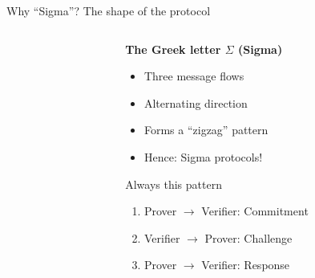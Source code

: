 \documentclass[aspectratio=169, lualatex, handout]{beamer}
\begin{document}
\begin{frame}{Why ``Sigma''? The shape of the protocol}
	\begin{columns}[c]
		\begin{column}{0.5\textwidth}
			\begin{center}
				\huge
			\end{center}
		\end{column}
		\begin{column}{0.5\textwidth}
			\textbf{The Greek letter $\Sigma$ (Sigma)}
			\begin{itemize}
				\item Three message flows
				\item Alternating direction
				\item Forms a ``zigzag'' pattern
				\item Hence: Sigma protocols!
			\end{itemize}
			\begin{alertblock}{Always this pattern}
				\begin{enumerate}
					\item Prover $\rightarrow$ Verifier: Commitment
					\item Verifier $\rightarrow$ Prover: Challenge
					\item Prover $\rightarrow$ Verifier: Response
				\end{enumerate}
			\end{alertblock}
		\end{column}
	\end{columns}
\end{frame}
\end{document}
